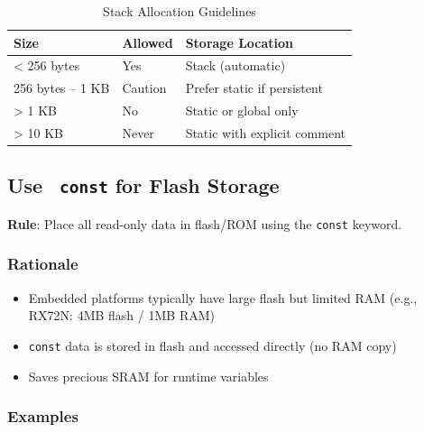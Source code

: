 \begin{table}[H]
\centering
\caption{Stack Allocation Guidelines}
\label{tab:stack-guidelines}
\begin{tabular}{|l|l|l|}
\hline
\textbf{Size} & \textbf{Allowed} & \textbf{Storage Location} \\
\hline
< 256 bytes & Yes & Stack (automatic) \\
\hline
256 bytes -- 1 KB & Caution & Prefer static if persistent \\
\hline
> 1 KB & No & Static or global only \\
\hline
> 10 KB & Never & Static with explicit comment \\
\hline
\end{tabular}
\end{table}

\subsection{Use \texttt { const} for
        Flash Storage}

\textbf{Rule}: Place all read-only data in flash/ROM using the \texttt{const} keyword.

\subsubsection{Rationale}

\begin{itemize}
\item Embedded platforms typically have large flash but limited RAM (e.g., RX72N: 4MB flash / 1MB RAM)
\item \texttt{const} data is stored in flash and accessed directly (no RAM copy)
\item Saves precious SRAM for runtime variables
\end{itemize}

\subsubsection{Examples}


